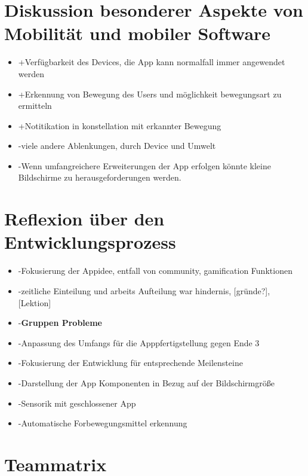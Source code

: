 \documentclass{article}
\begin{document}
    
\section{Diskussion besonderer Aspekte von Mobilität und
mobiler Software}
\begin{itemize}
\item +Verfügbarkeit des Devices, die App kann normalfall immer angewendet werden
\item +Erkennung von Bewegung des Users und möglichkeit bewegungsart zu ermitteln
\item +Notitikation in konstellation mit erkannter Bewegung
\item -viele andere Ablenkungen, durch Device und Umwelt
\item -Wenn umfangreichere Erweiterungen der App erfolgen könnte kleine Bildschirme zu herausgeforderungen werden.
\end{itemize}
    
   

\section{Reflexion über den Entwicklungsprozess}
 \begin{itemize}
    \item -Fokusierung der Appidee, entfall von community, gamification Funktionen
	\item -zeitliche Einteilung und arbeits Aufteilung war hindernis,         [gründe?], [Lektion]
	\item -\textbf{Gruppen Probleme}
	\item -Anpassung des Umfangs für die Apppfertigstellung gegen Ende 3
 	\item -Fokusierung der Entwicklung für entsprechende Meilensteine
	\item -Darstellung der App Komponenten in Bezug auf der Bildschirmgröße
	\item -Sensorik mit geschlossener App
	\item -Automatische Forbewegungsmittel erkennung
    
  \end{itemize}
  
  
\section{Teammatrix}
\end{document}
